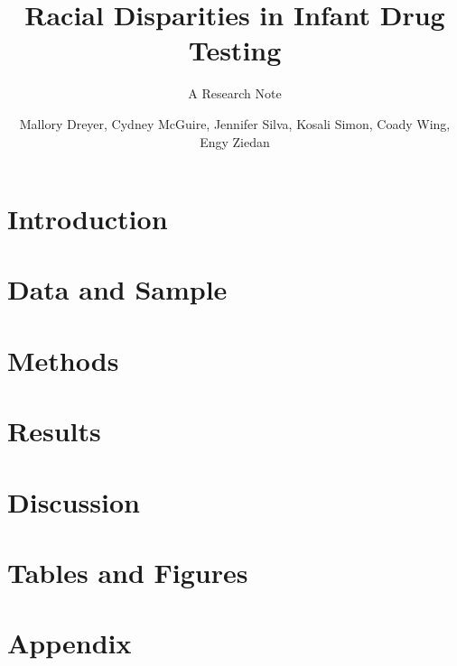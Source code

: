 \documentclass[12pt]{article}
\title{Racial Disparities in Infant Drug Testing}
\subtitle{A Research Note}
\author{
  Mallory Dreyer, %
  Cydney McGuire, %
  Jennifer Silva, %
  \newline
  Kosali Simon, %
  Coady Wing, %
  Engy Ziedan
}
\begin{document}
\maketitle

\begin{abstract}
\singlespacing

\end{abstract}

\newpage

\section*{Introduction}


\section*{Data and Sample}


\section*{Methods}


\section*{Results}


\section*{Discussion}


\newpage
\printbibliography
\newpage

\section*{Tables and Figures}


\newpage
\appendix 
\setcounter{table}{0}
\setcounter{figure}{0}
\renewcommand{\thetable}{A\arabic{table}}
\renewcommand{\thefigure}{A\arabic{figure}}

\section*{Appendix}



%
\end{document}
